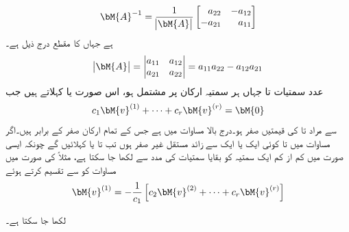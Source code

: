\begin{align}\label{مساوات_نظام_معکوس_قالب}
\bM{A}^{-1}=\frac{1}{\abs{\bM{A}}}
\begin{bmatrix*}[r]
a_{22}& -a_{12}\\
-a_{21}& a_{11}
\end{bmatrix*}
\end{align}
ہے جہاں  کا مقطع  درج ذیل ہے۔
\begin{align}
\abs{\bM{A}}=
\begin{vmatrix*}[r]
a_{11}&a_{12}\\
a_{21}&a_{22}
\end{vmatrix*}=a_{11}a_{22}-a_{12}a_{21}
\end{align}
 عدد سمتیات  تا  جہاں ہر سمتیہ  ارکان پر مشتمل ہو، اس صورت  یا  کہلاتے ہیں جب
\begin{align}\label{مساوات_نظام_خطی-طور_غیر_تابع_قالب}
c_1\bM{v}^{(1)}+\cdots+c_r \bM{v}^{(r)}=\bM{0}
\end{align}
سے مراد   تا  کی قیمتیں صفر ہو۔درج بالا مساوات میں   ہے جس کے تمام  ارکان صفر کے برابر ہیں۔اگر مساوات  میں  تا  کوئی ایک یا ایک سے زائد مستقل غیر صفر ہوں تب  تا   یا  کہلائیں گے چونکہ ایسی صورت میں کم از کم ایک سمتیہ کو بقایا سمتیات کی مدد سے لکھا جا سکتا ہے، مثلاً  کی صورت میں مساوات  کو  سے تقسیم کرتے ہوئے
\begin{align*}
\bM{v}^{(1)}=-\frac{1}{c_1}\left[c_2\bM{v}^{(2)}+\cdots+c_r \bM{v}^{(r)}\right]
\end{align*}

لکھا جا سکتا ہے۔

